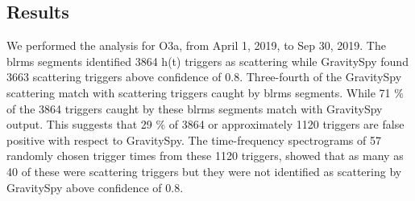 \documentclass[12pt]{iopart}
\begin{document}
\subsection{Results}


\par
We performed the analysis for O3a, from April 1, 2019, to Sep 30, 2019. The blrms segments identified 3864 h(t) triggers as scattering while GravitySpy found 3663 scattering triggers above confidence of 0.8.  Three-fourth of the GravitySpy scattering match with scattering triggers caught by blrms segments. While 71 $\%$ of the 3864 triggers caught by these blrms segments match with GravitySpy output. This suggests that 29 $\%$ of 3864 or approximately 1120 triggers are false positive with respect to GravitySpy. 
The time-frequency spectrograms of 57 randomly chosen trigger times from these 1120 triggers, showed that as many as 40 of these were scattering triggers but they were not identified as scattering by GravitySpy above confidence of 0.8. 
\end{document}
